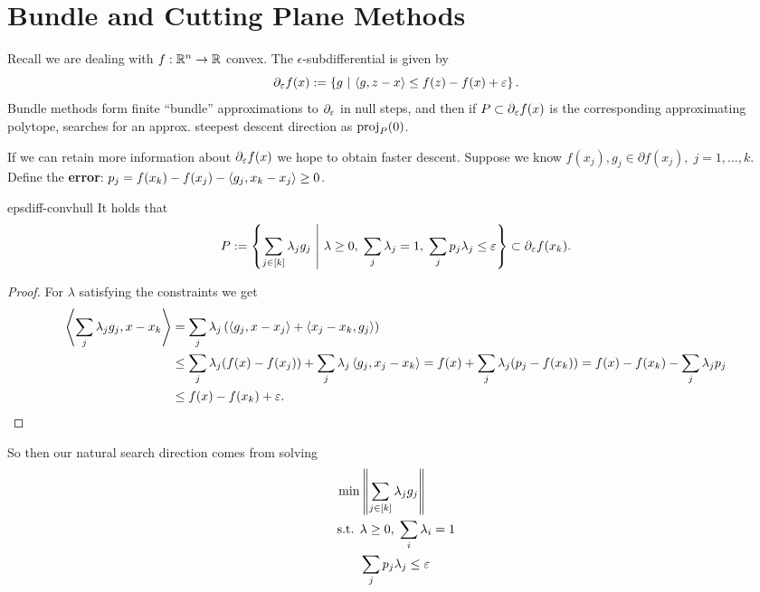 \section{Bundle and Cutting Plane Methods}
Recall we are dealing with $f: \mathbb{R}^n \to \mathbb{R}$ convex. The
$\epsilon$-subdifferential is given by
\[
	\partial_{\varepsilon} f(x) := \left\{ g \ \middle| \  \left\langle g, z - x \right\rangle \leq f(z) - f(x) +
	\varepsilon \right\}.
\]
Bundle methods form finite ``bundle'' approximations to $\partial_{\varepsilon}$ in null
steps, and then if $P \subset \partial_{\varepsilon} f(x)$ is the corresponding approximating
polytope, searches for an approx. steepest descent direction as $\mathrm{proj}_{P}(0)$.

If we can retain more information about $\partial_{\varepsilon} f(x)$ we hope to obtain
faster descent. Suppose we know $f(x_j), g_j \in \partial f(x_j), \; j = 1,
\dots, k$. Define the \textbf{error}: $p_j = f(x_k) - f(x_j) - \left\langle g_j, x_k -
x_j \right\rangle \geq 0$.

\begin{cproposition}{}{epsdiff-convhull}
	It holds that
	\[
		P := \left\{ \sum_{j \in [k]} \lambda_j g_j \ \middle| \ 
			\lambda \geq 0, \; \sum_j \lambda_j = 1, \; \sum_j p_j \lambda_j
		\leq \varepsilon \right\} \subset \partial_{\varepsilon} f(x_k).
	\]
\end{cproposition}
\begin{proof}
	For $\lambda$ satisfying the constraints we get
	\begin{align*}
		\left\langle \sum_j \lambda_j g_j, x - x_k \right\rangle &=
		\sum_j \lambda_j \left( \left\langle g_j, x - x_j \right\rangle + \left\langle x_j - x_k, g_j \right\rangle\right)
		\\
										   &\leq
		\sum_j \lambda_j (f(x) - f(x_j)) + \sum_j \lambda_j \left\langle g_j, x_j - x_k \right\rangle
		= f(x) + \sum_j \lambda_j (p_j - f(x_k))
		= f(x) - f(x_k) - \sum_j \lambda_j p_j \\
										   &\leq f(x) - f(x_k) + \varepsilon.
	\end{align*}
\end{proof}

So then our natural search direction comes from solving
\begin{align}
	\begin{aligned}
		\min & \left \| \sum_{j \in [k]} \lambda_j g_j \right \| \\
		\mbox{s.t. } & \lambda \geq 0, \; \sum_i \lambda_i = 1 \\
					 & \sum_j p_j \lambda_j \leq \varepsilon
	\end{aligned}
	\label{eq:primal-epsdiff-view}
\end{align}

